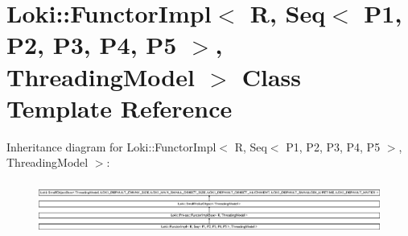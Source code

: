 \hypertarget{classLoki_1_1FunctorImpl_3_01R_00_01Seq_3_01P1_00_01P2_00_01P3_00_01P4_00_01P5_01_4_00_01ThreadingModel_01_4}{}\section{Loki\+:\+:Functor\+Impl$<$ R, Seq$<$ P1, P2, P3, P4, P5 $>$, Threading\+Model $>$ Class Template Reference}
\label{classLoki_1_1FunctorImpl_3_01R_00_01Seq_3_01P1_00_01P2_00_01P3_00_01P4_00_01P5_01_4_00_01ThreadingModel_01_4}
Inheritance diagram for Loki\+:\+:Functor\+Impl$<$ R, Seq$<$ P1, P2, P3, P4, P5 $>$, Threading\+Model $>$\+:\begin{figure}[H]
\begin{center}
\leavevmode
\includegraphics[height=1.751368cm]{classLoki_1_1FunctorImpl_3_01R_00_01Seq_3_01P1_00_01P2_00_01P3_00_01P4_00_01P5_01_4_00_01ThreadingModel_01_4}
\end{center}
\end{figure}
